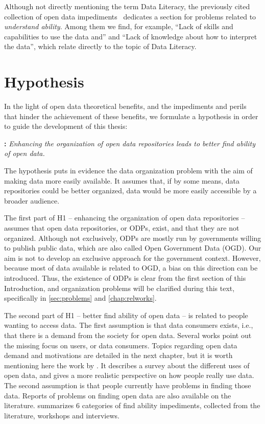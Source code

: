 {Although not directly mentioning  the term Data Literacy, the previously cited collection of open data impediments~\cite{Zuiderwijk2012} dedicates a section for problems related to \emph{understand ability}.
Among them we find, for example, ``Lack of skills and capabilities to use the data and'' and ``Lack of knowledge about how to interpret the data'', which relate directly to the topic of Data Literacy.

\section{Hypothesis}

In the light of open data theoretical benefits, and the impediments and perils that hinder the achievement of these benefits, we formulate a hypothesis in order to guide the development of this thesis:



\noindent\textbf{:} \emph{Enhancing the organization of open data repositories leads to better find ability of open data.}


The hypothesis puts in evidence the data organization problem with the aim of making data more easily available.
It assumes that, if by some means, data repositories could be better organized, data would be more easily accessible by a broader audience.

The first part of H1 -- enhancing the organization of open data repositories -- assumes that open data repositories, or ODPs, exist, and that they are not organized.
Although not exclusively, ODPs are mostly run by governments willing to publish public data, which are also called Open Government Data (OGD).
Our aim is not to develop an exclusive approach for the government context.
However, because most of data available is related to OGD, a bias on this direction can be introduced.
Thus, the existence of ODPs is clear from the first section of this Introduction, and organization problems will be clarified during this text, specifically in \autoref{sec:problems} and \autoref{chap:relworks}.

The second part of H1 -- better find ability of open data -- is related to people wanting to access data.
The first assumption is that data consumers exists, i.e., that there is a demand from the society for open data.
Several works point out the missing focus on users, or data consumers.
Topics regarding open data demand and motivations are detailed in the next chapter, but it is worth mentioning here the work by . 
It describes a survey about the different uses of open data, and gives a more realistic perspective on how people really use data.
The second assumption is that people currently have problems in finding those data.
Reports of problems on finding open data are also available on the literature.
 summarizes 6 categories of find ability impediments, collected from the literature, workshops and interviews.

}
